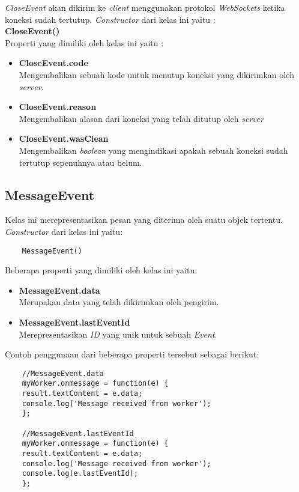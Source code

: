 \textit{CloseEvent} akan dikirim ke \textit{client} menggunakan protokol \textit{WebSockets} ketika koneksi sudah tertutup. \textit{Constructor} dari kelas ini yaitu : \\

\textbf{CloseEvent()} \\

Properti yang dimiliki oleh kelas ini yaitu : 

\begin{itemize}
	\item \textbf{CloseEvent.code} \\ Mengembalikan sebuah kode untuk menutup koneksi yang dikirimkan oleh \textit{server}.
	\item \textbf{CloseEvent.reason} \\ Mengembalikan alasan dari koneksi yang telah ditutup oleh \textit{server}
	\item \textbf{CloseEvent.wasClean} \\ Mengembalikan \textit{boolean} yang mengindikasi apakah sebuah koneksi sudah tertutup sepenuhnya atau belum.
\end{itemize}



\subsection{MessageEvent}
Kelas ini merepresentasikan pesan yang diterima oleh suatu objek tertentu. \textit{Constructor} dari kelas ini yaitu: 

\begin{lstlisting}
	MessageEvent()
\end{lstlisting}

Beberapa properti yang dimiliki oleh kelas ini yaitu: 

\begin{itemize}
	\item \textbf{MessageEvent.data} \\ Merupakan data yang telah dikirimkan oleh pengirim.
	\item \textbf{MessageEvent.lastEventId} \\ Merepresentasikan \textit{ID} yang unik untuk sebuah \textit{Event}.
\end{itemize}

Contoh penggunaan dari beberapa properti tersebut sebagai berikut:

\begin{lstlisting}
	//MessageEvent.data
	myWorker.onmessage = function(e) {
	result.textContent = e.data;
	console.log('Message received from worker');
	};
	
	//MessageEvent.lastEventId
	myWorker.onmessage = function(e) {
	result.textContent = e.data;
	console.log('Message received from worker');
	console.log(e.lastEventId);
	};
\end{lstlisting}


